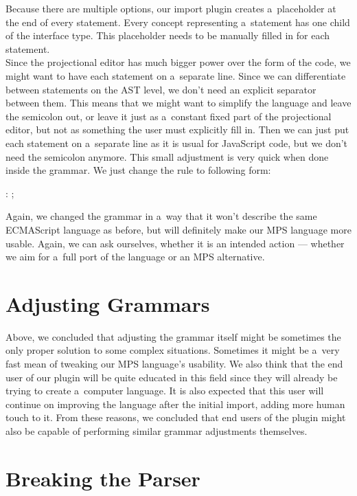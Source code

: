 Because there are multiple options, our import plugin creates a~placeholder at the end of every statement.
Every concept representing a~statement has one child of the  interface type.
This placeholder needs to be manually filled in for each statement.
\\

Since the projectional editor has much bigger power over the form of the code, we might want to have each statement on a~separate line.
Since we can differentiate between statements on the AST level, we don't need an explicit separator between them.
This means that we might want to simplify the language and leave the semicolon out, or leave it just as a~constant fixed part of the projectional editor, but not as something the user must explicitly fill in.
Then we can just put each statement on a~separate line as it is usual for JavaScript code, but we don't need the semicolon anymore.
This small adjustment is very quick when done inside the grammar.
We just change the  rule to following form:

\begin{antlr}
	 : \literal{;} ;
\end{antlr}

Again, we changed the grammar in a~way that it won't describe the same ECMAScript language as before, but will definitely make our MPS language more usable.
Again, we can ask ourselves, whether it is an intended action --- whether we aim for a~full port of the language or an MPS alternative.

\section{Adjusting Grammars}
Above, we concluded that adjusting the grammar itself might be sometimes the only proper solution to some complex situations.
Sometimes it might be a~very fast mean of tweaking our MPS language's usability.
We also think that the end user of our plugin will be quite educated in this field since they will already be trying to create a~computer language.
It is also expected that this user will continue on improving the language after the initial import, adding more human touch to it.
From these reasons, we concluded that end users of the plugin might also be capable of performing similar grammar adjustments themselves.

\section{Breaking the Parser}
\label{chap:breaking_the_parser}

